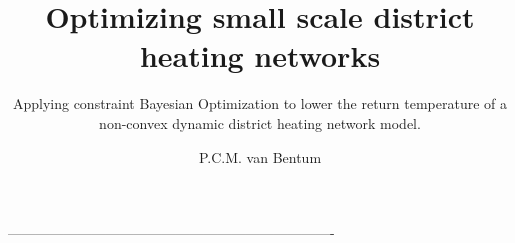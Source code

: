 \documentclass{tudelft-report}
\begin{document}
\frontmatter

\title{Optimizing small scale district
heating networks}
\subtitle{Applying constraint Bayesian Optimization to lower the return temperature of a non-convex dynamic district heating network model.}
\author{P.C.M. van Bentum}


\makecover

\newpage





\tableofcontents

% 


\mainmatter











\setcounter{biburlnumpenalty}{7000}
\setcounter{biburllcpenalty}{7000}
\setcounter{biburlucpenalty}{7000}

\printbibliography[heading=bibintoc,title=References]

% 
----------------------------------------------------------------------

\appendix



% 
\end{document}
